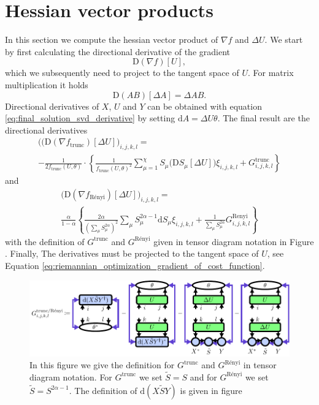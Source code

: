 \section{Hessian vector products}
\label{sec:renyi_trunc_hvps}
%
%
In this section we compute the hessian vector product of $\nabla f$ and $\Delta U$. We start by first calculating the directional derivative of the gradient
\begin{equation}
	\text{D}\left(\nabla f\right)\left[U\right],
\end{equation}
which we subsequently need to project to the tangent space of $U$. For matrix multiplication it holds\cite{cite:the_matrix_cook_book}
\begin{equation}
	\text{D}\left(AB\right)\left[\Delta A\right] = \Delta AB.
\end{equation}
Directional derivatives of $X$, $U$ and $Y$ can be obtained with equation \eqref{eq:final_solution_svd_derivative} by setting $\text{d}A = \Delta U\theta$. The final result are the directional derivatives
\begin{multline}
	\big((\text{D}(\nabla f_\text{trunc})[\Delta U]\big)_{i,j,k,l} = \\
	-\frac{1}{2f_\text{trunc}(U, \theta)} \cdot \left\{\frac{1}{f_\text{trunc}(U,\theta)^2}\sum_{\mu=1}^{\chi}S_\mu\big(\text{D}S_\mu[\Delta U]\big)\xi_{i,j,k,l} + G^\text{trunc}_{i,j,k,l}\right\}
\end{multline}
and
\begin{multline}	
	\big(\text{D}(\nabla f_\text{Rényi})[\Delta U]\big)_{i,j,k,l} = \\
	\frac{\alpha}{1-\alpha} \left\{\frac{2\alpha}{\left(\sum_\mu S_\mu^{2\alpha}\right)^2}\sum_\mu S_\mu^{2\alpha-1}\text{d}S_\mu\xi_{i,j,k,l} + \frac{1}{\sum_\mu S_\mu^{2\alpha}}G^\text{Renyi}_{i,j,k,l}\right\}
\end{multline}
with the definition of $G^\text{trunc}$ and $G^\text{Rényi}$ given in tensor diagram notation in Figure . Finally, The derivatives must be projected to the tangent space of $U$, see Equation \eqref{eq:riemannian_optimization_gradient_of_cost_function}.
\begin{figure}
	\centering
	\includegraphics[scale=0.9]{figures/tikz/gradient_and_hvp/G_definition/G_definition.pdf}
	\caption{In this figure we give the definition for $G^\text{trunc}$ and $G^\text{Rényi}$ in tensor diagram notation. For $G^\text{trunc}$ we set  $\tilde{S} = S$ and for $G^\text{Rényi}$ we set  $\tilde{S} = S^{2\alpha-1}$. The definition of $\text{d}(X\tilde{S}Y)$ is given in figure \protect{}}
	\label{fig:hvp_G_definition}
\end{figure}
